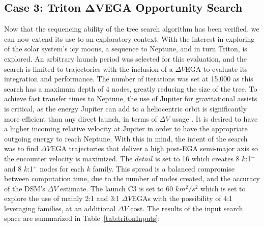 \documentclass[letterpaper, preprint, paper,11pt]{AAS}	%
\begin{document}
\subsection*{Case 3: Triton $\boldsymbol{\Delta V}$EGA Opportunity Search}

Now that the sequencing ability of the tree search algorithm has been verified, we can now extend its use to an exploratory context. With the interest in exploring of the solar system's icy moons, a sequence to Neptune, and in turn Triton, is explored\cite{Hubbard2010}. An arbitrary launch period was selected for this evaluation, and the search is limited to trajectories with the inclusion of a $\Delta V$EGA to evaluate its integration and performance. The number of iterations was set at 15,000 as this search has a maximum depth of 4 nodes, greatly reducing the size of the tree. To achieve fast transfer times to Neptune, the use of Jupiter for gravitational assists is critical, as the energy Jupiter can add to a heliocentric orbit is significantly more efficient than any direct launch, in terms of $\Delta V$ usage \cite{Landau2010}. It is desired to have a higher incoming relative velocity at Jupiter in order to have the appropriate outgoing energy to reach Neptune. With this in mind, the intent of the search was to find $\Delta V$EGA trajectories that deliver a high post-EGA semi-major axis so the encounter velocity is maximized. The $\textit{detail}$ is set to 16 which creates 8 $k$:1$^{-}$ and 8 $k$:1$^{+}$ nodes for each $k$ family. This spread is a balanced compromise between computation time, due to the number of nodes created, and the accuracy of the DSM's $\Delta V$ estimate. The launch C3 is set to 60 $km^2/s^2$ which is set to explore the use of mainly 2:1 and 3:1 $\Delta V$EGAs with the possibility of 4:1 leveraging families, at an additional $\Delta V$ cost. The results of the input search space are summarized in Table~\ref{tab:tritonInputs}:
\end{document}
